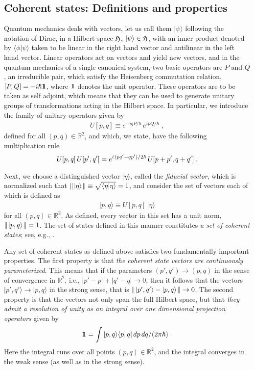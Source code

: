 \documentclass[12pt]{article}
\def\one{1\hskip-.37em 1}
\def\ra{\rightarrow}
\def\s{\hskip.08em}
\def\bn{\begin{eqnarray}}     %
\def\en{\end{eqnarray}}       %
\def\<{\langle}
\def\>{\rangle}
\begin{document}
\subsection{Coherent states: Definitions and properties}
Quantum mechanics deals with vectors, let us call them $|\psi\>$ following 
the notation of Dirac, in a Hilbert space $\frak H$, $|\psi\>\in{\frak H}$, 
with an inner product denoted by $\<\phi|\psi\>$ taken to be linear in the 
right hand vector and antilinear in the left hand vector. Linear operators 
act on vectors and yield new vectors, and in the quantum mechanics of a 
single canonical system, two basic operators are $P$ and $Q$, an 
irreducible pair,  which satisfy the Heisenberg commutation relation, 
$[P,Q]=-i\hbar\one$, where $\one$ denotes the unit operator. These 
operators are to be taken as self adjoint, which means that they can be 
used to generate unitary groups of transformations acting in the Hilbert 
space. In particular, we introduce the family of unitary operators given by
   \bn  U[p,q]\equiv e^{-iqP/\hbar}\,e^{ipQ/\hbar}\;,  \en
defined for all $(p,q)\in{\mathbb R}^2$, and which, we state, have the 
following multiplication rule
   \bn  U[p,q]\,U[p',q']=e^{i\s(pq'-qp')/2\hbar}\,U[p+p',q+q'] \;. \en

Next, we choose a distinguished vector $|\eta\>$, called the {\it fiducial 
vector}, 
which is normalized such that $\||\s\eta\>\s\|\equiv\sqrt{\<\eta|\eta\>}=1$, 
and consider the set of vectors each of which is defined as
  \bn  |p,q\>\equiv U[p,q]\,|\eta\>  \en
for all $(p,q)\in{\mathbb R}^2$. As defined, every vector in this set has 
a unit norm, $\|\s|p,q\>\s\|=1$. The set of states defined in this manner 
constitutes {\it a set of coherent states}; see, e.g., \cite{klabs}. 

Any set of coherent states as defined above satisfies two fundamentally 
important properties. The first property is that {\it the coherent state 
vectors are continuously parameterized}. This means that if the parameters 
$(p',q')\ra(p,q)$ in the sense of convergence in ${\mathbb R}^2$, i.e., 
$|p'-p|+|q'-q|\ra0$, then it follows that the vectors $|p',q'\>\ra|p,q\>$ 
in the strong sense, that is $\|\s|p',q'\>-|p,q\>\s\|\ra0$. The second 
property is that the vectors not only span the full Hilbert space, but 
that {\it they admit a resolution of unity as an integral over one 
dimensional projection operators} given by
  \bn  \one=\int|p,q\>\<p,q|\,dp\, dq/(2\pi\hbar)\;. \en
Here the integral runs over all points $(p,q)\in{\mathbb R}^2$, and the 
integral converges in the weak sense (as well as in the strong sense).
\end{document}
